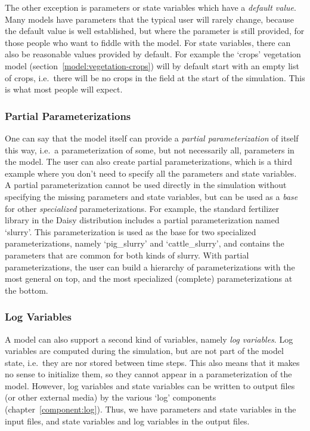 The other exception is parameters or state variables which have a
\emph{default value}.  Many models have parameters that the typical
user will rarely change, because the default value is well
established, but where the parameter is still provided, for those
people who want to fiddle with the model.  For state variables, there
can also be reasonable values provided by default.  For example the
`crops' vegetation model (section~\ref{model:vegetation-crops}) will
by default start with an empty list of crops, i.e.\ there will be no
crops in the field at the start of the simulation.  This is what most
people will expect.

\subsubsection{Partial Parameterizations}

One can say that the model itself can provide a \emph{partial
  parameterization} of itself this way, i.e.\ a parameterization of
some, but not necessarily all, parameters in the model.  The user can
also create partial parameterizations, which is a third example where
you don't need to specify all the parameters and state variables.  A
partial parameterization cannot be used directly in the simulation
without specifying the missing parameters and state variables, but can
be used as a \emph{base} for other \emph{specialized}
parameterizations.  For example, the standard fertilizer library in
the Daisy distribution includes a partial parameterization named
`slurry'.  This parameterization is used as the base for two
specialized parameterizations, namely `pig\_slurry' and
`cattle\_slurry', and contains the parameters that are common for
both kinds of slurry.  With partial parameterizations, the user can
build a hierarchy of parameterizations with the most general on top,
and the most specialized (complete) parameterizations at the bottom.

\subsubsection{Log Variables}

A model can also support a second kind of variables, namely \emph{log
  variables}.  Log variables are computed during the simulation, but
are not part of the model state, i.e.\ they are nor stored between
time steps.  This also means that it makes no sense to initialize
them, so they cannot appear in a parameterization of the model.
However, log variables and state variables can be written to output
files (or other external media) by the various `log' components
(chapter~\ref{component:log}).  Thus, we have parameters and state
variables in the input files, and state variables and log variables in
the output files.

